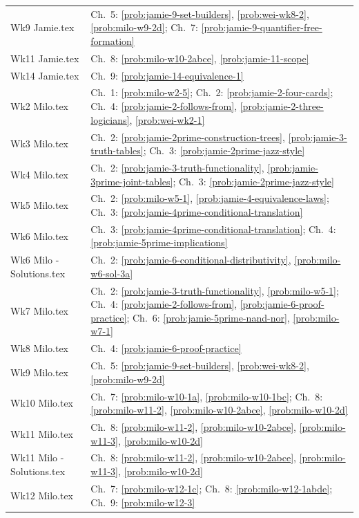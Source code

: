 \documentclass[11pt,letterpaper,oneside,openany]{book}
\begin{document}
\begin{longtable}{@{}p{}p{}@{}}
Wk9 Jamie.tex & Ch.~5: \ref{prob:jamie-9-set-builders}, \ref{prob:wei-wk8-2}, \ref{prob:milo-w9-2d}; Ch.~7: \ref{prob:jamie-9-quantifier-free-formation} \\
Wk11 Jamie.tex & Ch.~8: \ref{prob:milo-w10-2abce}, \ref{prob:jamie-11-scope} \\
Wk14 Jamie.tex & Ch.~9: \ref{prob:jamie-14-equivalence-1} \\
Wk2 Milo.tex & Ch.~1: \ref{prob:milo-w2-5}; Ch.~2: \ref{prob:jamie-2-four-cards}; Ch.~4: \ref{prob:jamie-2-follows-from}, \ref{prob:jamie-2-three-logicians}, \ref{prob:wei-wk2-1} \\
Wk3 Milo.tex & Ch.~2: \ref{prob:jamie-2prime-construction-trees}, \ref{prob:jamie-3-truth-tables}; Ch.~3: \ref{prob:jamie-2prime-jazz-style} \\
Wk4 Milo.tex & Ch.~2: \ref{prob:jamie-3-truth-functionality}, \ref{prob:jamie-3prime-joint-tables}; Ch.~3: \ref{prob:jamie-2prime-jazz-style} \\
Wk5 Milo.tex & Ch.~2: \ref{prob:milo-w5-1}, \ref{prob:jamie-4-equivalence-laws}; Ch.~3: \ref{prob:jamie-4prime-conditional-translation} \\
Wk6 Milo.tex & Ch.~3: \ref{prob:jamie-4prime-conditional-translation}; Ch.~4: \ref{prob:jamie-5prime-implications} \\
Wk6 Milo - Solutions.tex & Ch.~2: \ref{prob:jamie-6-conditional-distributivity}, \ref{prob:milo-w6-sol-3a} \\
Wk7 Milo.tex & Ch.~2: \ref{prob:jamie-3-truth-functionality}, \ref{prob:milo-w5-1}; Ch.~4: \ref{prob:jamie-2-follows-from}, \ref{prob:jamie-6-proof-practice}; Ch.~6: \ref{prob:jamie-5prime-nand-nor}, \ref{prob:milo-w7-1} \\
Wk8 Milo.tex & Ch.~4: \ref{prob:jamie-6-proof-practice} \\
Wk9 Milo.tex & Ch.~5: \ref{prob:jamie-9-set-builders}, \ref{prob:wei-wk8-2}, \ref{prob:milo-w9-2d} \\
Wk10 Milo.tex & Ch.~7: \ref{prob:milo-w10-1a}, \ref{prob:milo-w10-1bc}; Ch.~8: \ref{prob:milo-w11-2}, \ref{prob:milo-w10-2abce}, \ref{prob:milo-w10-2d} \\
Wk11 Milo.tex & Ch.~8: \ref{prob:milo-w11-2}, \ref{prob:milo-w10-2abce}, \ref{prob:milo-w11-3}, \ref{prob:milo-w10-2d} \\
Wk11 Milo - Solutions.tex & Ch.~8: \ref{prob:milo-w11-2}, \ref{prob:milo-w10-2abce}, \ref{prob:milo-w11-3}, \ref{prob:milo-w10-2d} \\
Wk12 Milo.tex & Ch.~7: \ref{prob:milo-w12-1c}; Ch.~8: \ref{prob:milo-w12-1abde}; Ch.~9: \ref{prob:milo-w12-3} \\

\end{longtable}
\end{document}
